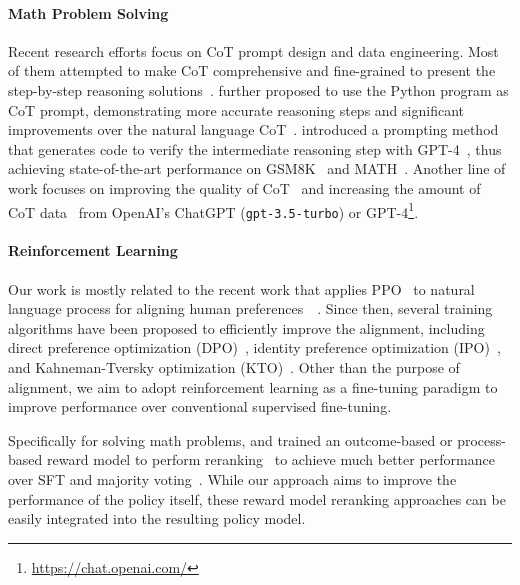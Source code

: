 \paragraph{Math Problem Solving}
Recent research efforts focus on CoT prompt design and data engineering. 
Most of them attempted to make CoT comprehensive and fine-grained to present the step-by-step reasoning solutions~\cite{nye2021show,fu2022complexity,zhou2022least,khot2022decomposed,zelikman2022star,imani2023mathprompter,miao2023selfcheck}.
\citet{gao2023pal} further proposed to use the Python program as CoT prompt, demonstrating more accurate reasoning steps and significant improvements over the natural language CoT~\cite{wei2022chain}.
\citet{zhou2023solving} introduced a prompting method that generates code to verify the intermediate reasoning step with GPT-4~\cite{openai2023gpt4}, thus achieving state-of-the-art performance on GSM8K~\cite{cobbe2021training} and MATH~\cite{hendrycks2021measuring}.  
Another line of work focuses on improving the quality of CoT~\cite{wang2023mathcoder,liu2023tinygsm,yu2023metamath} and increasing the amount of CoT data~\cite{luo2023wizardmath,yue2023mammoth} from OpenAI's ChatGPT (\texttt{gpt-3.5-turbo}) or GPT-4\footnote{\url{https://chat.openai.com/}}. 

\paragraph{Reinforcement Learning}
Our work is mostly related to the recent work that applies PPO~\cite{schulman2017proximal} to natural language process for aligning human preferences~~\cite{ouyang2022training}. 
Since then, several training algorithms have been proposed to efficiently improve the alignment,
including direct preference optimization (DPO)~\cite{rafailov2023direct}, identity preference optimization (IPO)~\cite{azar2023general}, and Kahneman-Tversky optimization (KTO)~\cite{ethayarajh2023halos}. 
Other than the purpose of alignment, we aim to adopt reinforcement learning as a fine-tuning paradigm to improve performance over conventional supervised fine-tuning.

Specifically for solving math problems, \citet{uesato2022solving} and \citet{lightman2023lets}  trained an outcome-based or process-based reward model to perform reranking~\cite{cobbe2021training} to achieve much better performance over SFT and majority voting~\cite{wang2022self}. 
While our approach aims to improve the performance of the policy itself, these reward model reranking approaches can be easily integrated into the resulting policy model.

